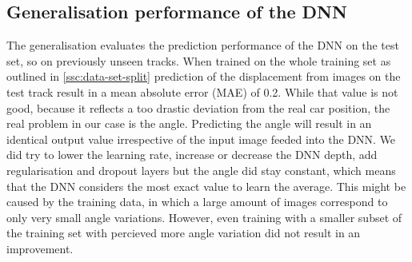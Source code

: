 \documentclass[10pt,a4paper,twoside,journal]{IEEEtran}
\begin{document}
\subsection{Generalisation performance of the DNN}
\label{ssc:generalisation}
The generalisation evaluates the prediction performance of the DNN on the test set, so on previously unseen tracks. When trained on the whole training set as outlined in \autoref{ssc:data-set-split} prediction of the displacement from images on the test track result in a mean absolute error (MAE) of 0.2. While that value is not good, because it reflects a too drastic deviation from the real car position, the real problem in our case is the angle. Predicting the angle will result in an identical output value irrespective of the input image feeded into the DNN. We did try to lower the learning rate, increase or decrease the DNN depth, add regularisation and dropout layers but the angle did stay constant, which means that the DNN considers the most exact value to learn the average. This might be caused by the training data, in which a large amount of images correspond to only very small angle variations. However, even training with a smaller subset of the training set with percieved more angle variation did not result in an improvement. 
\end{document}
